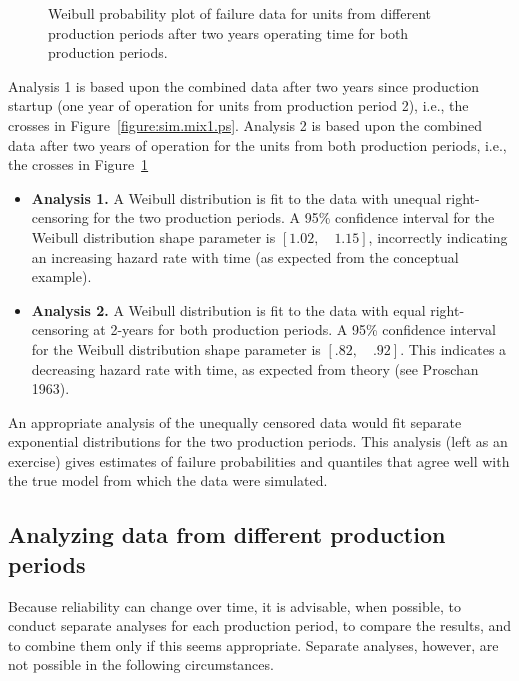 \begin{figure}
\caption{Weibull probability plot of failure data for units from
different production periods after two years operating time
for both production periods.}
\label{figure:sim.mix2.ps}
\end{figure}

Analysis 1 is based upon the combined data after two years since
production startup (one year of operation for units from production
period 2), i.e., the crosses in Figure~\ref{figure:sim.mix1.ps}.
Analysis 2 is based upon the combined data after two years of
operation for the units from both production periods, i.e., the
crosses in Figure~\ref{figure:sim.mix2.ps}
\begin{itemize}
\item
{\bf Analysis 1.} A Weibull distribution is fit to the data with
unequal right-censoring for the two production periods.  A 95\%
confidence interval for the Weibull distribution shape parameter is
$[1.02,\quad 1.15]$, incorrectly indicating an increasing hazard
rate with time (as expected from the conceptual example).
\item
{\bf Analysis 2.}  A Weibull distribution is fit to the data with
equal right-censoring at 2-years for both production periods. A 95\%
confidence interval for the Weibull distribution shape parameter is
$[.82,\quad .92].$ This indicates a decreasing hazard rate with
time, as expected from theory (see Proschan 1963).
\end{itemize}

An appropriate analysis of the unequally censored data would fit
separate exponential distributions for the two production
periods. This analysis (left as an exercise) gives estimates of
failure probabilities and quantiles that agree well with the true
model from which the data were simulated.

\subsection{Analyzing data from different production periods}

Because reliability can change over time, it is advisable, when possible, to
conduct separate analyses for each production period, to compare the
results, and to combine them only if this seems appropriate.  Separate
analyses, however, are not possible in the following circumstances.

